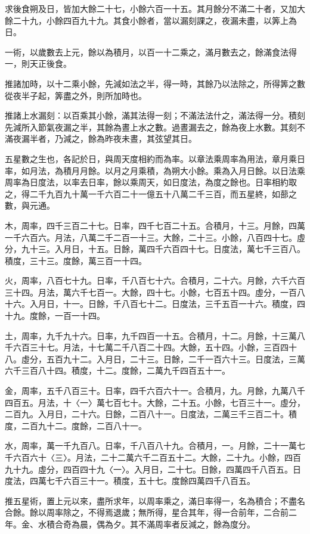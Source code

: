 \begin{pinyinscope}
求後食朔及日，皆加大餘二十七，小餘六百一十五。其月餘分不滿二十者，又加大餘二十九，小餘四百九十九。其食小餘者，當以漏刻課之，夜漏未盡，以筭上為日。

一術，以歲數去上元，餘以為積月，以百一十二乘之，滿月數去之，餘滿食法得一，則天正後食。

推諸加時，以十二乘小餘，先減如法之半，得一時，其餘乃以法除之，所得筭之數從夜半子起，筭盡之外，則所加時也。

推諸上水漏刻：以百乘其小餘，滿其法得一刻；不滿法法什之，滿法得一分。積刻先減所入節氣夜漏之半，其餘為晝上水之數。過晝漏去之，餘為夜上水數。其刻不滿夜漏半者，乃減之，餘為昨夜未晝，其弦望其日。

五星數之生也，各記於日，與周天度相約而為率。以章法乘周率為用法，章月乘日率，如月法，為積月月餘。以月之月乘積，為朔大小餘。乘為入月日餘。以日法乘周率為日度法，以率去日率，餘以乘周天，如日度法，為度之餘也。日率相約取之，得二千九百九十萬一千六百二十一億五十八萬二千三百，而五星終，如蔀之數，與元通。

木，周率，四千三百二十七。日率，四千七百二十五。合積月，十三。月餘，四萬一千六百六。月法，八萬二千二百一十三。大餘，二十三。小餘，八百四十七。虛分，九十三。入月日，十五。日餘，萬四千六百四十七。日度法，萬七千三百八。積度，三十三。度餘，萬三百一十四。

火，周率，八百七十九。日率，千八百七十六。合積月，二十六。月餘，六千六百三十四。月法，萬六千七百一。大餘，四十七。小餘，七百五十四。虛分，一百八十六。入月日，十一。日餘，千八百七十二。日度法，三千五百一十六。積度，四十九。度餘，一百一十四。

土，周率，九千九十六。日率，九千四百一十五。合積月，十二。月餘，十三萬八千六百三十七。月法，十七萬二千八百二十四。大餘，五十四。小餘，三百四十八。虛分，五百九十二。入月日，二十三。日餘，二千一百六十三。日度法，三萬六千三百八十四。積度，十二。度餘，二萬九千四百五十一。

金，周率，五千八百三十。日率，四千六百六十一。合積月，九。月餘，九萬八千四百五。月法，十〈一〉萬七百七十。大餘，二十五。小餘，七百三十一。虛分，二百九。入月日，二十六。日餘，二百八十一。日度法，二萬三千三百二十。積度，二百九十二。度餘，二百八十一。

水，周率，萬一千九百八。日率，千八百八十九。合積月，一。月餘，二十一萬七千六百六十〈三〉。月法，二十二萬六千二百五十二。大餘，二十九。小餘，四百九十九。虛分，四百四十九〈一〉。入月日，二十七。日餘，四萬四千八百五。日度法，四萬七千六百三十一。積度，五十七。度餘四萬四千八百五。

推五星術，置上元以來，盡所求年，以周率乘之，滿日率得一，名為積合；不盡名合餘。餘以周率除之，不得焉退歲；無所得，星合其年，得一合前年，二合前二年。金、水積合奇為晨，偶為夕。其不滿周率者反減之，餘為度分。


\end{pinyinscope}

